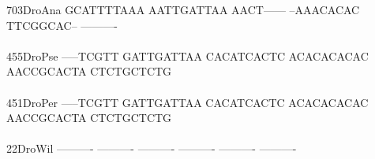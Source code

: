 \documentclass[11pt,twoside,reqno,a4paper]{article}
\begin{document}
{703\hspace*{2\charwidth}DroAna	GCATTTTAAA	AATTGATTAA	AACT------	--AAACACAC	TTCGGCAC--	----------	\\
\hspace*{5\charwidth}\hspace*{7\charwidth}\hspace*{1\charwidth}\hspace*{1\charwidth}\hspace*{1\charwidth}\hspace*{1\charwidth}\hspace*{1\charwidth}\hspace*{1\charwidth}\\
455\hspace*{2\charwidth}DroPse	-----TCGTT	GATTGATTAA	CACATCACTC	ACACACACAC	AACCGCACTA	CTCTGCTCTG	\\
\hspace*{5\charwidth}\hspace*{7\charwidth}\hspace*{1\charwidth}\hspace*{1\charwidth}\hspace*{1\charwidth}\hspace*{1\charwidth}\hspace*{1\charwidth}\hspace*{1\charwidth}\\
451\hspace*{2\charwidth}DroPer	-----TCGTT	GATTGATTAA	CACATCACTC	ACACACACAC	AACCGCACTA	CTCTGCTCTG	\\
\hspace*{5\charwidth}\hspace*{7\charwidth}\hspace*{1\charwidth}\hspace*{1\charwidth}\hspace*{1\charwidth}\hspace*{1\charwidth}\hspace*{1\charwidth}\hspace*{1\charwidth}\\
22\hspace*{3\charwidth}DroWil	----------	----------	----------	----------	----------	----------	\\
\hspace*{5\charwidth}\hspace*{7\charwidth}\hspace*{1\charwidth}\hspace*{1\charwidth}\hspace*{1\charwidth}\hspace*{1\charwidth}\hspace*{1\charwidth}\hspace*{1\charwidth}\\
}
\end{document}
